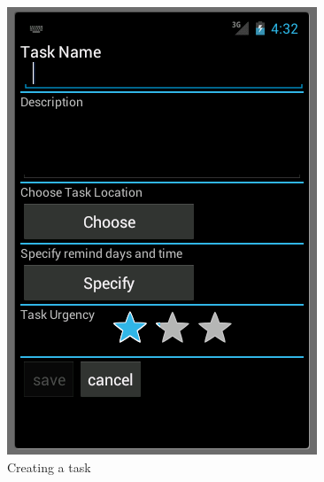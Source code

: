  \begin{figure}[h]
  \caption{Creating a task}
  \center
  	\includegraphics[scale=0.25]{../resources/create-task.png}
\end{figure}

